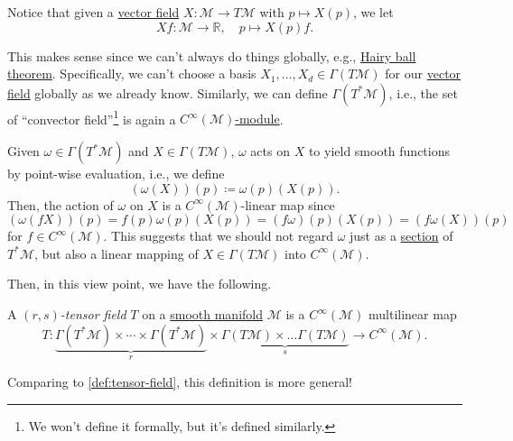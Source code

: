 \begin{notation}
	Notice that given a \hyperref[def:vector-field]{vector field} \(X\colon \mathcal{M} \to  T \mathcal{M} \) with \(p \mapsto X(p)\), we let
	\[
		Xf\colon \mathcal{M} \to \mathbb{R} ,\quad p \mapsto X(p) f.
	\]
\end{notation}

This makes sense since we can't always do things globally, e.g., \href{https://en.wikipedia.org/wiki/Hairy_ball_theorem}{Hairy ball theorem}. Specifically, we can't choose a basis \(X_1, \dots , X_d\in \Gamma (T \mathcal{M} )\) for our \hyperref[def:vector-field]{vector field} globally as we already know. Similarly, we can define \(\Gamma (T^{\ast} \mathcal{M} )\), i.e., the set of ``convector field''\footnote{We won't define it formally, but it's defined similarly.} is again a \hyperref[def:module]{\(C^{\infty} (\mathcal{M} )\)-module}.

\begin{eg}
	Given \(\omega \in \Gamma (T^{\ast} \mathcal{M} )\) and \(X\in \Gamma (T \mathcal{M} )\), \(\omega \) acts on \(X\) to yield smooth functions by point-wise evaluation, i.e., we define
	\[
		\left( \omega (X) \right) (p) \coloneqq \omega (p) (X(p)).
	\]
	Then, the action of \(\omega \) on \(X\) is a \(C^{\infty} (\mathcal{M} )\)-linear map since
	\[
		(\omega (fX))(p)
		= f(p) \omega (p) (X(p))
		= (f \omega )(p) (X(p))
		= (f \omega (X))(p)
	\]
	for \(f\in C^\infty (\mathcal{M} )\). This suggests that we should not regard \(\omega \) just as a \hyperref[def:section]{section} of \(T^{\ast} \mathcal{M} \), but also a linear mapping of \(X\in \Gamma (T \mathcal{M} )\) into \(C^{\infty} (\mathcal{M} )\).
\end{eg}

Then, in this view point, we have the following.

\begin{definition}\label{def:tensor-field*}
	A \emph{\((r, s)\)-tensor field} \(T\) on a \hyperref[def:smooth-manifold]{smooth manifold} \(\mathcal{M} \) is a \(C^{\infty} (\mathcal{M} )\) multilinear map
	\[
		T \colon \underbrace{\Gamma (T ^{\ast} \mathcal{M} ) \times \cdots \times \Gamma (T ^{\ast} \mathcal{M} )}_{r} \times \underbrace{\Gamma (T \mathcal{M} ) \times \dots \Gamma (T \mathcal{M} )}_{s} \to C^{\infty} (\mathcal{M} ).
	\]
\end{definition}

Comparing to \autoref{def:tensor-field}, this definition is more general!

